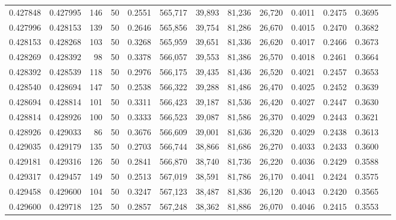 \begin{tabular}{rrrrrrrrrrrrr}
0.427848 & 0.427995 &   146 &  50 &                                     0.2551 & 565,717 &  39,893 &  81,236 &  26,720 & 0.4011 & 0.2475 & 0.3695 \\
0.427996 & 0.428153 &   139 &  50 &                                     0.2646 & 565,856 &  39,754 &  81,286 &  26,670 & 0.4015 & 0.2470 & 0.3682 \\
0.428153 & 0.428268 &   103 &  50 &                                     0.3268 & 565,959 &  39,651 &  81,336 &  26,620 & 0.4017 & 0.2466 & 0.3673 \\
0.428269 & 0.428392 &    98 &  50 &                                     0.3378 & 566,057 &  39,553 &  81,386 &  26,570 & 0.4018 & 0.2461 & 0.3664 \\
0.428392 & 0.428539 &   118 &  50 &                                     0.2976 & 566,175 &  39,435 &  81,436 &  26,520 & 0.4021 & 0.2457 & 0.3653 \\
0.428540 & 0.428694 &   147 &  50 &                                     0.2538 & 566,322 &  39,288 &  81,486 &  26,470 & 0.4025 & 0.2452 & 0.3639 \\
0.428694 & 0.428814 &   101 &  50 &                                     0.3311 & 566,423 &  39,187 &  81,536 &  26,420 & 0.4027 & 0.2447 & 0.3630 \\
0.428814 & 0.428926 &   100 &  50 &                                     0.3333 & 566,523 &  39,087 &  81,586 &  26,370 & 0.4029 & 0.2443 & 0.3621 \\
0.428926 & 0.429033 &    86 &  50 &                                     0.3676 & 566,609 &  39,001 &  81,636 &  26,320 & 0.4029 & 0.2438 & 0.3613 \\
0.429035 & 0.429179 &   135 &  50 &                                     0.2703 & 566,744 &  38,866 &  81,686 &  26,270 & 0.4033 & 0.2433 & 0.3600 \\
0.429181 & 0.429316 &   126 &  50 &                                     0.2841 & 566,870 &  38,740 &  81,736 &  26,220 & 0.4036 & 0.2429 & 0.3588 \\
0.429317 & 0.429457 &   149 &  50 &                                     0.2513 & 567,019 &  38,591 &  81,786 &  26,170 & 0.4041 & 0.2424 & 0.3575 \\
0.429458 & 0.429600 &   104 &  50 &                                     0.3247 & 567,123 &  38,487 &  81,836 &  26,120 & 0.4043 & 0.2420 & 0.3565 \\
0.429600 & 0.429718 &   125 &  50 &                                     0.2857 & 567,248 &  38,362 &  81,886 &  26,070 & 0.4046 & 0.2415 & 0.3553 \\

\end{tabular}
